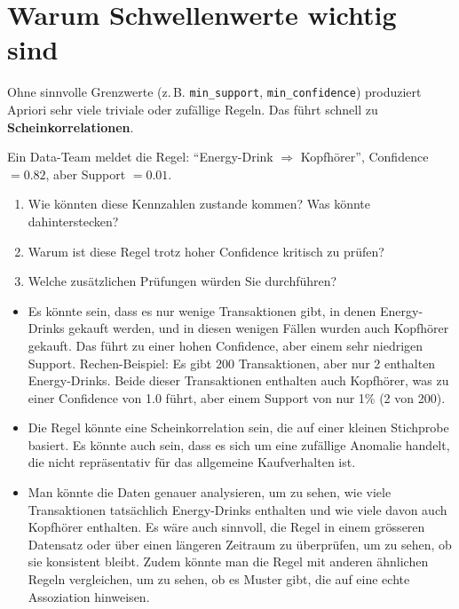 \section{Warum Schwellenwerte wichtig sind}

\begin{mycaution}
    Ohne sinnvolle Grenzwerte (z.\,B. \texttt{min\_support}, \texttt{min\_confidence})
    produziert Apriori sehr viele triviale oder zufällige Regeln.
    Das führt schnell zu \textbf{Scheinkorrelationen}.
\end{mycaution}

\begin{myexercise}
    Ein Data-Team meldet die Regel:
    \enquote{Energy-Drink $\Rightarrow$ Kopfhörer},
    Confidence $= 0.82$, aber Support $= 0.01$.
    \begin{enumerate}
        \item Wie könnten diese Kennzahlen zustande kommen? Was könnte dahinterstecken?
        \item Warum ist diese Regel trotz hoher Confidence kritisch zu prüfen?
        \item Welche zusätzlichen Prüfungen würden Sie durchführen?
    \end{enumerate}
    \begin{myanswer}
        \begin{itemize}
            \item Es könnte sein, dass es nur wenige Transaktionen gibt, in denen Energy-Drinks gekauft werden, und in diesen wenigen Fällen wurden auch Kopfhörer gekauft. Das führt zu einer hohen Confidence, aber einem sehr niedrigen Support. Rechen-Beispiel: Es gibt 200 Transaktionen, aber nur 2 enthalten Energy-Drinks. Beide dieser Transaktionen enthalten auch Kopfhörer, was zu einer Confidence von 1.0 führt, aber einem Support von nur 1\% (2 von 200).
            \item Die Regel könnte eine Scheinkorrelation sein, die auf einer kleinen Stichprobe basiert. Es könnte auch sein, dass es sich um eine zufällige Anomalie handelt, die nicht repräsentativ für das allgemeine Kaufverhalten ist.
            \item Man könnte die Daten genauer analysieren, um zu sehen, wie viele Transaktionen tatsächlich Energy-Drinks enthalten und wie viele davon auch Kopfhörer enthalten. Es wäre auch sinnvoll, die Regel in einem grösseren Datensatz oder über einen längeren Zeitraum zu überprüfen, um zu sehen, ob sie konsistent bleibt. Zudem könnte man die Regel mit anderen ähnlichen Regeln vergleichen, um zu sehen, ob es Muster gibt, die auf eine echte Assoziation hinweisen.
        \end{itemize}
    \end{myanswer}
\end{myexercise}

